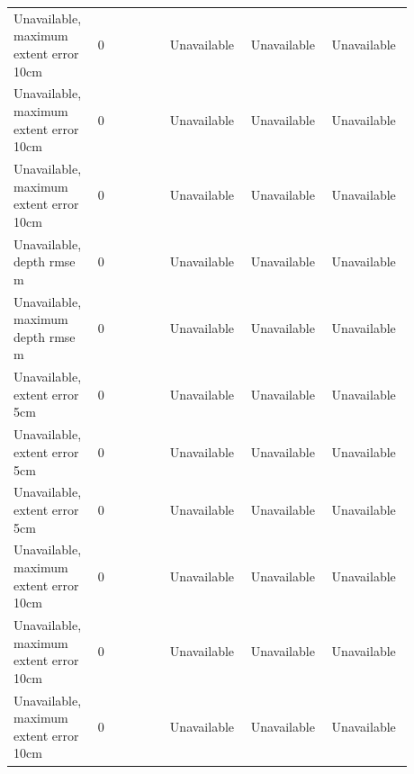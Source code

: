 \begin{longtable}{p{0.1760\linewidth}p{0.1760\linewidth}p{0.1760\linewidth}p{0.1760\linewidth}p{0.1760\linewidth}}
Unavailable, maximum extent error 10cm & 0 & Unavailable & Unavailable & Unavailable \\
Unavailable, maximum extent error 10cm & 0 & Unavailable & Unavailable & Unavailable \\
Unavailable, maximum extent error 10cm & 0 & Unavailable & Unavailable & Unavailable \\
Unavailable, depth rmse m & 0 & Unavailable & Unavailable & Unavailable \\
Unavailable, maximum depth rmse m & 0 & Unavailable & Unavailable & Unavailable \\
Unavailable, extent error 5cm & 0 & Unavailable & Unavailable & Unavailable \\
Unavailable, extent error 5cm & 0 & Unavailable & Unavailable & Unavailable \\
Unavailable, extent error 5cm & 0 & Unavailable & Unavailable & Unavailable \\
Unavailable, maximum extent error 10cm & 0 & Unavailable & Unavailable & Unavailable \\
Unavailable, maximum extent error 10cm & 0 & Unavailable & Unavailable & Unavailable \\
Unavailable, maximum extent error 10cm & 0 & Unavailable & Unavailable & Unavailable \\
\end{longtable}
